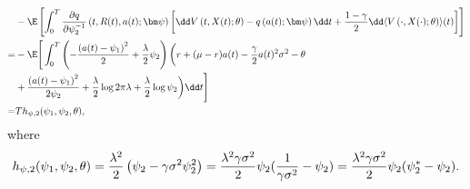 \[ \begin{aligned}
& -\E\left[  \int_0^T \frac{\partial q}{\partial \psi_2^{-1}}\left(t, R(t), a(t);\bm\psi \right) \left[ \dd V\left(t , X(t);\theta  \right) - q\left( a(t) ;\bm\psi\right)\dd t + \frac{1-\gamma}{2}\dd \langle V\left( \cdot,X(\cdot);\theta \right)\rangle(t)  \right]  \right] \\
= & -\E\Bigg[ \int_0^T \left( -\frac{\left( a(t) - \psi_1 \right)^2}{2} + \frac{\lambda}{2}\psi_2 \right) \bigg( r + (\mu - r)a(t) - \frac{\gamma}{2}a(t)^2\sigma^2  -\theta \\
& +  \frac{\left( a(t) - \psi_{1} \right)^2}{2\psi_{2}} + \frac{\lambda}{2}\log2\pi\lambda + \frac{\lambda}{2}\log\psi_{2} \bigg)\dd t \Bigg] \\
= & T h_{\psi,2}( \psi_{1},\psi_{2},\theta ),
\end{aligned} \]
where 
\begin{equation}
\label{eq:mean update psi 2}
h_{\psi, 2}( \psi_{1},\psi_{2},\theta) \\
= \frac{\lambda^2}{2}\left( \psi_2 - \gamma \sigma^2 \psi_2^2\right) = \frac{\lambda^2 \gamma \sigma^2}{2}\psi_2 (\frac{1}{\gamma\sigma^2} - \psi_2) =  \frac{\lambda^2 \gamma \sigma^2}{2}\psi_2 (\psi_2^* - \psi_2) .
\end{equation}


